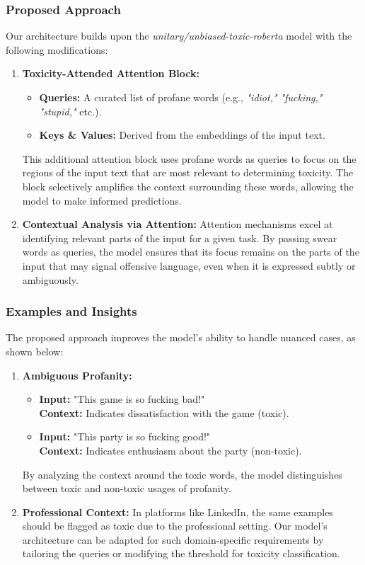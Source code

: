\subsubsection{Proposed Approach}
Our architecture builds upon the \textit{unitary/unbiased-toxic-roberta} model with the following modifications:
\begin{enumerate}
    \item \textbf{Toxicity-Attended Attention Block:}
    \begin{itemize}
        \item \textbf{Queries:} A curated list of profane words (e.g., \textit{"idiot," "fucking," "stupid,"} etc.).
        \item \textbf{Keys \& Values:} Derived from the embeddings of the input text.
    \end{itemize}
    This additional attention block uses profane words as queries to focus on the regions of the input text that are most relevant to determining toxicity. The block selectively amplifies the context surrounding these words, allowing the model to make informed predictions.
    
    \item \textbf{Contextual Analysis via Attention:}  
    Attention mechanisms excel at identifying relevant parts of the input for a given task. By passing swear words as queries, the model ensures that its focus remains on the parts of the input that may signal offensive language, even when it is expressed subtly or ambiguously.
\end{enumerate}

\subsubsection{Examples and Insights}
The proposed approach improves the model’s ability to handle nuanced cases, as shown below:

\begin{enumerate}
    \item \textbf{Ambiguous Profanity:}
    \begin{itemize}
        \item \textbf{Input:} "This game is so fucking bad!"\\
        \textbf{Context:} Indicates dissatisfaction with the game (toxic).
        \item \textbf{Input:} "This party is so fucking good!"\\
        \textbf{Context:} Indicates enthusiasm about the party (non-toxic).
    \end{itemize}
    By analyzing the context around the toxic words, the model distinguishes between toxic and non-toxic usages of profanity.
    
    \item \textbf{Professional Context:}  
    In platforms like LinkedIn, the same examples should be flagged as toxic due to the professional setting. Our model’s architecture can be adapted for such domain-specific requirements by tailoring the queries or modifying the threshold for toxicity classification.
\end{enumerate}

